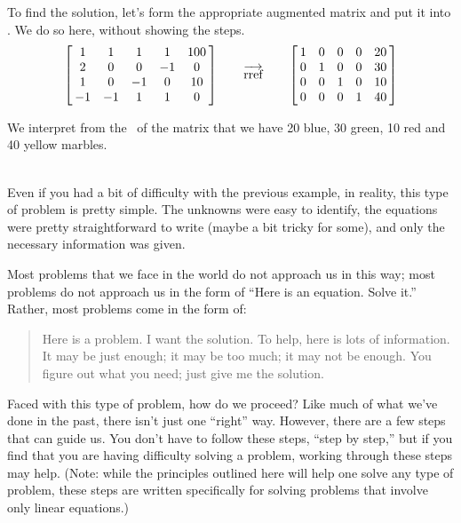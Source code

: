 {To find the solution, let's form the appropriate augmented matrix and put it into \rref. We do so here, without showing the steps.$$\bmx{ccccc}1&1&1&1&100\\2&0&0&-1&0\\1&0&-1&0&10\\-1&-1&1&1&0\\ \emx \quad\quad \overrightarrow{\text{rref}} \quad\quad \bmx{ccccc} 1&0&0&0&20\\0&1&0&0&30\\0&0&1&0&10\\0&0&0&1&40\\ \emx$$

We interpret from the \rref\ of the matrix that we have 20 blue, 30 green, 10 red and 40 yellow marbles. }\\ %

Even if you had a bit of difficulty with the previous example, in reality, this type of problem is pretty simple. The unknowns were easy to identify, the equations were pretty straightforward to write (maybe a bit tricky for some), and only the necessary information was given.

Most problems that we face in the world do not approach us in this way; most problems do not approach us in the form of ``Here is an equation. Solve it.'' Rather, most problems come in the form of: \begin{quote}Here is a problem. I want the solution. To help, here is lots of information. It may be just enough; it may be too much; it may not be enough. You figure out what you need; just give me the solution.\end{quote}

Faced with this type of problem, how do we proceed? Like much of what we've done in the past, there isn't just one ``right'' way. However, there are a few steps that can guide us. You don't have to follow these steps, ``step by step,'' but if you find that you are having difficulty solving a problem, working through these steps may help. (Note: while the principles outlined here will help one solve any type of problem, these steps are written specifically for solving problems that involve only linear equations.)

